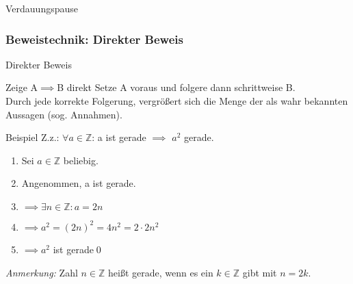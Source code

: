 \begin{frame}[standout]
    Verdauungspause
\end{frame}

\subsubsection{Beweistechnik: Direkter Beweis}
\begin{frame}[fragile]{Direkter Beweis}
    \begin{alertblock}{Zeige A$\implies$B direkt}
    Setze A voraus und folgere dann schrittweise B.\\
    Durch jede korrekte Folgerung, vergrößert sich die Menge der als wahr bekannten Aussagen (sog. Annahmen).
    \end{alertblock}
    \begin{exampleblock}{Beispiel}
    Z.z.: \alert<2>{$\forall a\in\mathbb{Z}$}: \alert<3>{a ist gerade} $\implies$ \alert<6>{$a^2$ gerade.}
    \begin{enumerate}
        \item \alert<2>{Sei $a\in\mathbb{Z}$ beliebig.}
        \item \alert<3>{Angenommen, a ist gerade.}
        \item \alert<4>{$\implies \exists n\in\mathbb{Z} : a = 2n$}
        \item \alert<5>{$\implies a^2 = (2n)^2 = 4n^2 = 2 \cdot 2n^2$}
        \item \alert<6>{$\implies a^2$ ist gerade}\qed\;
    \end{enumerate}
    \end{exampleblock}
    \small{\emph{\alert<4>{Anmerkung:}} Zahl $n\in\mathbb{Z}$ heißt gerade, wenn es ein $k\in\mathbb{Z}$ gibt mit $n=2k$.}
\end{frame}


